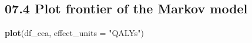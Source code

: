 \documentclass[
]{article}
\newenvironment{Shaded}{\begin{snugshade}}{\end{snugshade}}
\newcommand{\DataTypeTok}[1]{\textcolor[rgb]{0.13,0.29,0.53}{#1}}
\newcommand{\KeywordTok}[1]{\textcolor[rgb]{0.13,0.29,0.53}{\textbf{#1}}}
\newcommand{\NormalTok}[1]{#1}
\newcommand{\StringTok}[1]{\textcolor[rgb]{0.31,0.60,0.02}{#1}}
\begin{document}
\hypertarget{plot-frontier-of-the-markov-model}{%
\subsection{07.4 Plot frontier of the Markov
model}\label{plot-frontier-of-the-markov-model}}

\begin{Shaded}
\begin{Highlighting}[]
\KeywordTok{plot}\NormalTok{(df_cea, }\DataTypeTok{effect_units =} \StringTok{"QALYs"}\NormalTok{)}
\end{Highlighting}
\end{Shaded}
\end{document}
